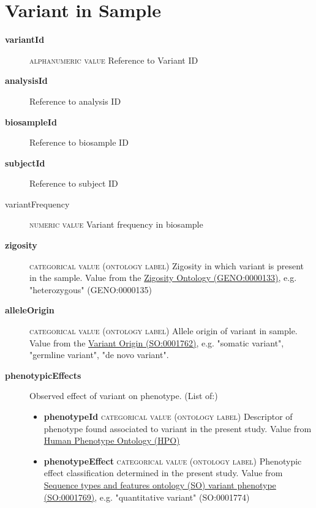 \documentclass[a4paper, 10pt]{article}        %
\begin{document}
 
 
   \section*{ {\color{teal} Variant in Sample}}
  
  \begin{description}
  	\item[\textbf{variantId}]  {\textsc{alphanumeric value}} Reference to Variant ID 	
	\item[\textbf{analysisId}] Reference to analysis ID
	\item[\textbf{biosampleId}] Reference to biosample ID
	\item[\textbf{subjectId}] Reference to subject ID
	\item[variantFrequency] {\textsc{numeric value}} Variant frequency in biosample
	\item[\textbf{zigosity}] {\textsc{categorical value (ontology label)}} Zigosity in which variant is present in the sample. Value from the \href{https://github.com/monarch-initiative/GENO-ontology/}{Zigosity Ontology (GENO:0000133)}, e.g. "heterozygous" (GENO:0000135)
	\item[\textbf{alleleOrigin}] {\textsc{categorical value (ontology label)}} Allele origin of variant in sample. Value from the \href{http://purl.obolibrary.org/obo/SO_0001762}{Variant Origin (SO:0001762)}, e.g. "somatic variant", "germline variant", "de novo variant". %
	\item[\textbf{phenotypicEffects}] Observed effect of variant on phenotype. (List of:)
	\begin{itemize}
				\item[] \textbf{phenotypeId} {\textsc{categorical value (ontology label)}} Descriptor of phenotype found associated to variant in the present study. Value from \href{http:purl.obolibrary.org/obo/HP_0000001}{Human Phenotype Ontology (HPO)}
				\item[] \textbf{phenotypeEffect} {\textsc{categorical value (ontology label)}} Phenotypic effect classification determined in the present study. Value from \href{http://purl/obolibrary.org/obo/SO_0001769}{Sequence types and features ontology (SO) variant phenotype (SO:0001769)}, e.g. "quantitative variant" (SO:0001774)

\end{itemize}
\end{description}
\end{document}
